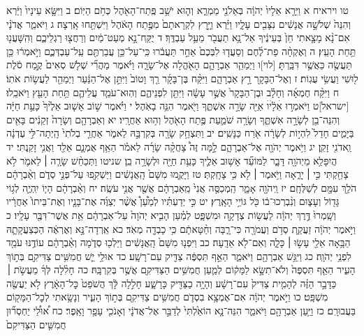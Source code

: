 \documentclass[twoside, openany, parskip=half, 11pt]{book}
\begin{document}
טו ויראיח א וַיֵּרָ֤א אֵלָיו֙ יְהֹוָ֔ה בְּאֵלֹנֵ֖י מַמְרֵ֑א וְה֛וּא יֹשֵׁ֥ב פֶּֽתַח־הָאֹ֖הֶל כְּחֹ֥ם הַיּֽוֹם׃ ב וַיִּשָּׂ֤א עֵינָיו֙ וַיַּ֔רְא וְהִנֵּה֙ שְׁלֹשָׁ֣ה אֲנָשִׁ֔ים נִצָּבִ֖ים עָלָ֑יו וַיַּ֗רְא וַיָּ֤רׇץ לִקְרָאתָם֙ מִפֶּ֣תַח הָאֹ֔הֶל וַיִּשְׁתַּ֖חוּ אָֽרְצָה׃ ג וַיֹּאמַ֑ר אֲדֹנָ֗י אִם־נָ֨א מָצָ֤אתִי חֵן֙ בְּעֵינֶ֔יךָ אַל־נָ֥א תַעֲבֹ֖ר מֵעַ֥ל עַבְדֶּֽךָ׃ ד יֻקַּֽח־נָ֣א מְעַט־מַ֔יִם וְרַחֲצ֖וּ רַגְלֵיכֶ֑ם וְהִֽשָּׁעֲנ֖וּ תַּ֥חַת הָעֵֽץ׃ ה וְאֶקְחָ֨ה פַת־לֶ֜חֶם וְסַעֲד֤וּ לִבְּכֶם֙ אַחַ֣ר תַּעֲבֹ֔רוּ כִּֽי־עַל־כֵּ֥ן עֲבַרְתֶּ֖ם עַֽל־עַבְדְּכֶ֑ם וַיֹּ֣אמְר֔וּ כֵּ֥ן תַּעֲשֶׂ֖ה כַּאֲשֶׁ֥ר דִּבַּֽרְתָּ׃ [לוי]ו וַיְמַהֵ֧ר אַבְרָהָ֛ם הָאֹ֖הֱלָה אֶל־שָׂרָ֑ה וַיֹּ֗אמֶר מַהֲרִ֞י שְׁלֹ֤שׁ סְאִים֙ קֶ֣מַח סֹ֔לֶת ל֖וּשִׁי וַעֲשִׂ֥י עֻגֽוֹת׃ ז וְאֶל־הַבָּקָ֖ר רָ֣ץ אַבְרָהָ֑ם וַיִּקַּ֨ח בֶּן־בָּקָ֜ר רַ֤ךְ וָטוֹב֙ וַיִּתֵּ֣ן אֶל־הַנַּ֔עַר וַיְמַהֵ֖ר לַעֲשׂ֥וֹת אֹתֽוֹ׃ ח וַיִּקַּ֨ח חֶמְאָ֜ה וְחָלָ֗ב וּבֶן־הַבָּקָר֙ אֲשֶׁ֣ר עָשָׂ֔ה וַיִּתֵּ֖ן לִפְנֵיהֶ֑ם וְהֽוּא־עֹמֵ֧ד עֲלֵיהֶ֛ם תַּ֥חַת הָעֵ֖ץ וַיֹּאכֵֽלוּ׃ [ישראל]ט וַיֹּאמְר֣וּ אֵׄלָ֔יׄוׄ אַיֵּ֖ה שָׂרָ֣ה אִשְׁתֶּ֑ךָ וַיֹּ֖אמֶר הִנֵּ֥ה בָאֹֽהֶל׃ י וַיֹּ֗אמֶר שׁ֣וֹב אָשׁ֤וּב אֵלֶ֙יךָ֙ כָּעֵ֣ת חַיָּ֔ה וְהִנֵּה־בֵ֖ן לְשָׂרָ֣ה אִשְׁתֶּ֑ךָ וְשָׂרָ֥ה שֹׁמַ֛עַת פֶּ֥תַח הָאֹ֖הֶל וְה֥וּא אַחֲרָֽיו׃ יא וְאַבְרָהָ֤ם וְשָׂרָה֙ זְקֵנִ֔ים בָּאִ֖ים בַּיָּמִ֑ים חָדַל֙ לִהְי֣וֹת לְשָׂרָ֔ה אֹ֖רַח כַּנָּשִֽׁים׃ יב וַתִּצְחַ֥ק שָׂרָ֖ה בְּקִרְבָּ֣הּ לֵאמֹ֑ר אַחֲרֵ֤י בְלֹתִי֙ הָֽיְתָה־לִּ֣י עֶדְנָ֔ה וַֽאדֹנִ֖י זָקֵֽן׃ יג וַיֹּ֥אמֶר יְהֹוָ֖ה אֶל־אַבְרָהָ֑ם לָ֣מָּה זֶּה֩ צָחֲקָ֨ה שָׂרָ֜ה לֵאמֹ֗ר הַאַ֥ף אֻמְנָ֛ם אֵלֵ֖ד וַאֲנִ֥י זָקַֽנְתִּי׃ יד הֲיִפָּלֵ֥א מֵיְהֹוָ֖ה דָּבָ֑ר לַמּוֹעֵ֞ד אָשׁ֥וּב אֵלֶ֛יךָ כָּעֵ֥ת חַיָּ֖ה וּלְשָׂרָ֥ה בֵֽן׃ שניטו וַתְּכַחֵ֨שׁ שָׂרָ֧ה ׀ לֵאמֹ֛ר לֹ֥א צָחַ֖קְתִּי כִּ֣י ׀ יָרֵ֑אָה וַיֹּ֥אמֶר ׀ לֹ֖א כִּ֥י צָחָֽקְתְּ׃ טז וַיָּקֻ֤מוּ מִשָּׁם֙ הָֽאֲנָשִׁ֔ים וַיַּשְׁקִ֖פוּ עַל־פְּנֵ֣י סְדֹ֑ם וְאַ֨בְרָהָ֔ם הֹלֵ֥ךְ עִמָּ֖ם לְשַׁלְּחָֽם׃ יז וַֽיהֹוָ֖ה אָמָ֑ר הַֽמְכַסֶּ֤ה אֲנִי֙ מֵֽאַבְרָהָ֔ם אֲשֶׁ֖ר אֲנִ֥י עֹשֶֽׂה׃ יח וְאַ֨בְרָהָ֔ם הָי֧וֹ יִֽהְיֶ֛ה לְג֥וֹי גָּד֖וֹל וְעָצ֑וּם וְנִ֨בְרְכוּ־ב֔וֹ כֹּ֖ל גּוֹיֵ֥י הָאָֽרֶץ׃ יט כִּ֣י יְדַעְתִּ֗יו לְמַ֩עַן֩ אֲשֶׁ֨ר יְצַוֶּ֜ה אֶת־בָּנָ֤יו וְאֶת־בֵּיתוֹ֙ אַחֲרָ֔יו וְשָֽׁמְרוּ֙ דֶּ֣רֶךְ יְהֹוָ֔ה לַעֲשׂ֥וֹת צְדָקָ֖ה וּמִשְׁפָּ֑ט לְמַ֗עַן הָבִ֤יא יְהֹוָה֙ עַל־אַבְרָהָ֔ם אֵ֥ת אֲשֶׁר־דִּבֶּ֖ר עָלָֽיו׃ כ וַיֹּ֣אמֶר יְהֹוָ֔ה זַעֲקַ֛ת סְדֹ֥ם וַעֲמֹרָ֖ה כִּי־רָ֑בָּה וְחַ֨טָּאתָ֔ם כִּ֥י כָבְדָ֖ה מְאֹֽד׃ כא אֵֽרְדָה־נָּ֣א וְאֶרְאֶ֔ה הַכְּצַעֲקָתָ֛הּ הַבָּ֥אָה אֵלַ֖י עָשׂ֣וּ ׀ כָּלָ֑ה וְאִם־לֹ֖א אֵדָֽעָה׃ כב וַיִּפְנ֤וּ מִשָּׁם֙ הָֽאֲנָשִׁ֔ים וַיֵּלְכ֖וּ סְדֹ֑מָה וְאַ֨בְרָהָ֔ם עוֹדֶ֥נּוּ עֹמֵ֖ד לִפְנֵ֥י יְהֹוָֽה׃ כג וַיִּגַּ֥שׁ אַבְרָהָ֖ם וַיֹּאמַ֑ר הַאַ֣ף תִּסְפֶּ֔ה צַדִּ֖יק עִם־רָשָֽׁע׃ כד אוּלַ֥י יֵ֛שׁ חֲמִשִּׁ֥ים צַדִּיקִ֖ם בְּת֣וֹךְ הָעִ֑יר הַאַ֤ף תִּסְפֶּה֙ וְלֹא־תִשָּׂ֣א לַמָּק֔וֹם לְמַ֛עַן חֲמִשִּׁ֥ים הַצַּדִּיקִ֖ם אֲשֶׁ֥ר בְּקִרְבָּֽהּ׃ כה חָלִ֨לָה לְּךָ֜ מֵעֲשֹׂ֣ת ׀ כַּדָּבָ֣ר הַזֶּ֗ה לְהָמִ֤ית צַדִּיק֙ עִם־רָשָׁ֔ע וְהָיָ֥ה כַצַּדִּ֖יק כָּרָשָׁ֑ע חָלִ֣לָה לָּ֔ךְ הֲשֹׁפֵט֙ כׇּל־הָאָ֔רֶץ לֹ֥א יַעֲשֶׂ֖ה מִשְׁפָּֽט׃ כו וַיֹּ֣אמֶר יְהֹוָ֔ה אִם־אֶמְצָ֥א בִסְדֹ֛ם חֲמִשִּׁ֥ים צַדִּיקִ֖ם בְּת֣וֹךְ הָעִ֑יר וְנָשָׂ֥אתִי לְכׇל־הַמָּק֖וֹם בַּעֲבוּרָֽם׃ כז וַיַּ֥עַן אַבְרָהָ֖ם וַיֹּאמַ֑ר הִנֵּה־נָ֤א הוֹאַ֙לְתִּי֙ לְדַבֵּ֣ר אֶל־אֲדֹנָ֔י וְאָנֹכִ֖י עָפָ֥ר וָאֵֽפֶר׃ כח א֠וּלַ֠י יַחְסְר֞וּן חֲמִשִּׁ֤ים הַצַּדִּיקִם֙ 
\end{document}
